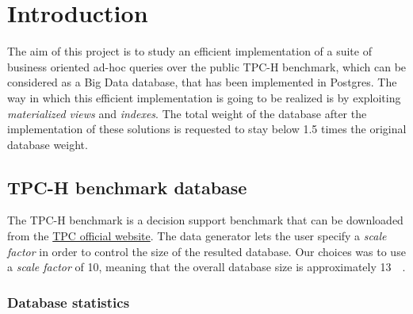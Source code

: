 

\section{Introduction}
\label{section:introductiooon}

The aim of this project is to study an efficient implementation of a suite of business oriented ad-hoc queries over the public TPC-H benchmark, which can be considered as a Big Data database, that has been implemented in Postgres. The way in which this efficient implementation is going to be realized is by exploiting \textit{materialized views} and \textit{indexes}. The total weight of the database after the implementation of these solutions is requested to stay below \num{1.5} times the original database weight.

\subsection{TPC-H benchmark database}

The TPC-H benchmark is a decision support benchmark that can be downloaded from the \href{https://www.tpc.org/tpch/}{TPC official website}. The data generator lets the user specify a \textit{scale factor} in order to control the size of the resulted database. Our choices was to use a \textit{scale factor} of \num{10}, meaning that the overall database size is approximately \SI{13}{\giga\byte}.

\subsubsection{Database statistics}

